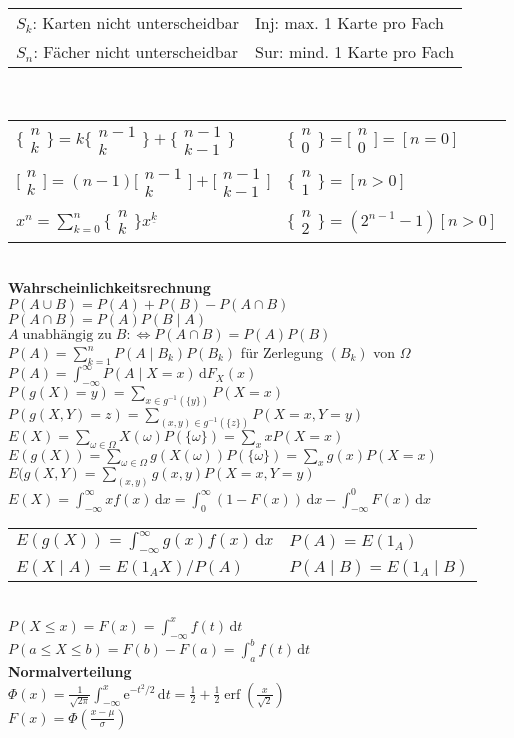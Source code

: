 \documentclass[a4paper,10pt,fleqn,twoside,twocolumn,dvipdfmx]{scrartcl}
\newcommand{\strong}[1]{\textsf{\textbf{#1}}}
\newcommand{\tsbrace}[2]{%
  \big\{\!\begin{smallmatrix}#1\\ #2\end{smallmatrix}\!\big\}}
\newcommand{\tsbracket}[2]{%
  \big[\!\begin{smallmatrix}#1\\ #2\end{smallmatrix}\!\big]}
\begin{document}
{\small\begin{tabular}{@{}l|l}
$S_k$: Karten nicht unterscheidbar & $\mathrm{Inj}$: max. 1 Karte pro Fach\\
$S_n$: Fächer nicht unterscheidbar & $\mathrm{Sur}$: mind. 1 Karte pro Fach
\end{tabular}}\\[4pt]
\begin{tabular}{@{}l|l}
$\tsbrace{n}{k} = k\tsbrace{n-1}{k}+\tsbrace{n-1}{k-1}$
& $\tsbrace{n}{0} = \tsbracket{n}{0} = [n{=}0]$\\[3pt]
$\tsbracket{n}{k} = (n-1)\tsbracket{n-1}{k}+\tsbracket{n-1}{k-1}$
& $\tsbrace{n}{1}=[n{>}0]$\\[3pt]
$x^n = \sum_{k=0}^n \tsbrace{n}{k} x^{\underline k}$
& $\tsbrace{n}{2} = (2^{n-1}-1)[n{>}0]$
\end{tabular}\\[4pt]
\strong{Wahrscheinlichkeitsrechnung}\\
$P(A\cup B) = P(A)+P(B)-P(A\cap B)$\\
$P(A\cap B) = P(A)P(B\mid A)$\\
$A\;\text{unabhängig zu}\;B :\Leftrightarrow P(A\cap B) = P(A)P(B)$\\
$P(A) = \sum_{k=1}^n P(A\mid B_k)P(B_k)$ für Zerlegung $(B_k)$ von $\Omega$\\
$P(A) = \int_{-\infty}^\infty P(A\mid X=x)\,\mathrm dF_X(x)$\\
$P(g(X)=y) = \sum_{x\in g^{-1}(\{y\})} P(X=x)$\\
$P(g(X,Y)=z) = \sum_{(x,y)\in g^{-1}(\{z\})} P(X=x,Y=y)$\\
$E(X) = \sum_{\omega\in\Omega} X(\omega)P(\{\omega\}) = \sum_x xP(X=x)$\\
$E(g(X)) = \sum_{\omega\in\Omega} g(X(\omega))P(\{\omega\}) = \sum_x g(x)P(X=x)$\\
$E(g(X,Y) = \sum_{(x,y)} g(x,y)P(X=x,Y=y)$\\
$E(X) = \int_{-\infty}^\infty xf(x)\,\mathrm dx
= \int_0^\infty (1-F(x))\,\mathrm dx - \int_{-\infty}^0 F(x)\,\mathrm dx$\\
\begin{tabular}{@{}l|l}
$E(g(X)) = \int_{-\infty}^\infty g(x)f(x)\,\mathrm dx$ & $P(A)=E(1_A)$\\
$E(X\mid A) = E(1_A X)/P(A)$ & $P(A\mid B) = E(1_A\mid B)$
\end{tabular}\\
$P(X\le x) = F(x) = \int_{-\infty}^x f(t)\,\mathrm dt$\\
$P(a\le X\le b) = F(b)-F(a) = \int_a^b f(t)\,\mathrm dt$\\[4pt]
\strong{Normalverteilung}\\
$\Phi(x) = \tfrac{1}{\sqrt{2\pi}}\int_{-\infty}^x \mathrm e^{-t^2/2}\,\mathrm dt
= \tfrac{1}{2}+\tfrac{1}{2}\operatorname{erf}(\tfrac{x}{\sqrt{2}})$\\
$F(x) = \Phi(\tfrac{x-\mu}{\sigma})$
\end{document}
